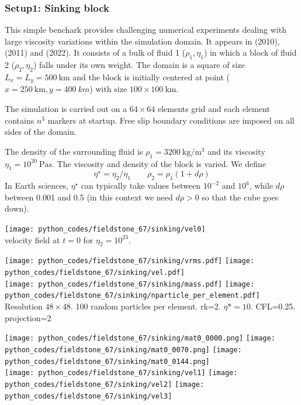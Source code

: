 \subsubsection*{Setup1: Sinking block} 

This simple benchark provides challenging numerical experiments dealing with large viscosity variations 
within the simulation domain. It appears in \textcite{gery10} (2010), \textcite{thie11} (2011) and
\textcite{thba22} (2022). It consists of a bulk of fluid 1 ($\rho_1,\eta_1$)
in which a block of fluid 2 ($\rho_2,\eta_2$) falls under its own weight.
The domain is a square of size $L_x=L_y=500~\si{\km}$ and the block is initially centered at 
point ($x=250~\si{\km},y=400~\si{km}$) with size $100\times100~\si{\km}$. 

The simulation is carried out on a $64\times64$ elements grid and each element contains $n^3$ markers
at startup. Free slip boundary conditions are imposed on all sides of the domain. 

The density of the surrounding fluid is $\rho_1=3200~\si{\kg\per\cubic\meter}$
and its viscosity $\eta_1=10^{20}~\si{\pascal\second}$.
The viscosity and density of the block is varied. We define
\[
\eta^\star=\eta_2/\eta_1
\quad\quad
\rho_2=\rho_1 (1 + d\rho)
\]
In Earth sciences, $\eta^\star$ can typically take values between $10^{-2}$ and $10^6$,
while $d\rho$ between 0.001 and 0.5 (in this context we need $d\rho>0$ so that the cube 
goes down).

\begin{center}
\texttt{[image: python\_codes/fieldstone\_67/sinking/vel0]}\\
{\captionfont velocity field at $t=0$ for $\eta_2=10^{23}$.}
\end{center}

\begin{center}
\texttt{[image: python\_codes/fieldstone\_67/sinking/vrms.pdf]}
\texttt{[image: python\_codes/fieldstone\_67/sinking/vel.pdf]}\\
\texttt{[image: python\_codes/fieldstone\_67/sinking/mass.pdf]}
\texttt{[image: python\_codes/fieldstone\_67/sinking/nparticle\_per\_element.pdf]}\\
{\captionfont Resolution $48\times48$. 100 random particles per element. rk=2. $\eta*=10$. CFL=0.25. 
projection=2}
\end{center}


\begin{center}
\texttt{[image: python\_codes/fieldstone\_67/sinking/mat0\_0000.png]}
\texttt{[image: python\_codes/fieldstone\_67/sinking/mat0\_0070.png]}
\texttt{[image: python\_codes/fieldstone\_67/sinking/mat0\_0144.png]}\\
\texttt{[image: python\_codes/fieldstone\_67/sinking/vel1]}
\texttt{[image: python\_codes/fieldstone\_67/sinking/vel2]}
\texttt{[image: python\_codes/fieldstone\_67/sinking/vel3]}
\end{center}



